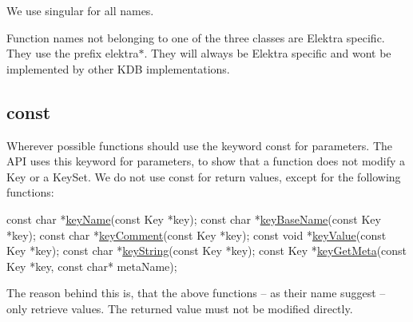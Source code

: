 We use singular for all names.

Function names not belonging to one of the three classes are Elektra specific. They use the prefix {\ttfamily elektra$\ast$}. They will always be Elektra specific and won\textquotesingle{}t be implemented by other K\+DB implementations.

\subsection*{const}

Wherever possible functions should use the keyword {\ttfamily const} for parameters. The A\+PI uses this keyword for parameters, to show that a function does not modify a {\ttfamily Key} or a {\ttfamily Key\+Set}. We do not use {\ttfamily const} for return values, except for the following functions\+:


\begin{DoxyCode}
\textcolor{keyword}{const} \textcolor{keywordtype}{char} *\hyperlink{group__keyname_ga8e805c726a60da921d3736cda7813513}{keyName}(\textcolor{keyword}{const} Key *key);
\textcolor{keyword}{const} \textcolor{keywordtype}{char} *\hyperlink{group__keyname_gaaff35e7ca8af5560c47e662ceb9465f5}{keyBaseName}(\textcolor{keyword}{const} Key *key);
\textcolor{keyword}{const} \textcolor{keywordtype}{char} *\hyperlink{group__meta_gac89fd319783b3457db45b4c09e55274a}{keyComment}(\textcolor{keyword}{const} Key *key);
\textcolor{keyword}{const} \textcolor{keywordtype}{void} *\hyperlink{group__keyvalue_ga6f29609c5da53c6dc26a98678d5752af}{keyValue}(\textcolor{keyword}{const} Key *key);
\textcolor{keyword}{const} \textcolor{keywordtype}{char} *\hyperlink{group__keyvalue_ga880936f2481d28e6e2acbe7486a21d05}{keyString}(\textcolor{keyword}{const} Key *key);
\textcolor{keyword}{const} Key  *\hyperlink{group__keymeta_ga9ed3875495ddb3d8a8d29158a60a147c}{keyGetMeta}(\textcolor{keyword}{const} Key *key, \textcolor{keyword}{const} \textcolor{keywordtype}{char}* metaName);
\end{DoxyCode}


The reason behind this is, that the above functions – as their name suggest – only retrieve values. The returned value must not be modified directly. 